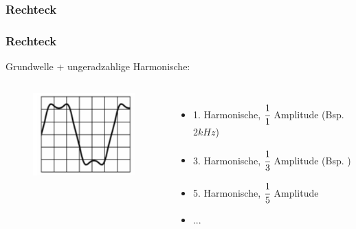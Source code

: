 \subsubsection{Rechteck}

\begin{frame}
  \frametitle{Rechteck}

  Grundwelle + ungeradzahlige Harmonische:


  \begin{columns}
    \begin{center}
      \begin{figure}
        \includegraphics[width=\textwidth,height=0.6\textheight,keepaspectratio]{a11/TB706.png}
      \end{figure}
    \end{center}
    \begin{itemize}
      \item 1. Harmonische, $\cfrac{1}{1}$ Amplitude (Bsp. $2kHz$)
      \item 3. Harmonische, $\cfrac{1}{3}$ Amplitude (Bsp. )
      \item 5. Harmonische, $\cfrac{1}{5}$ Amplitude
      \item ...
    \end{itemize}
  \end{columns}
\end{frame}

